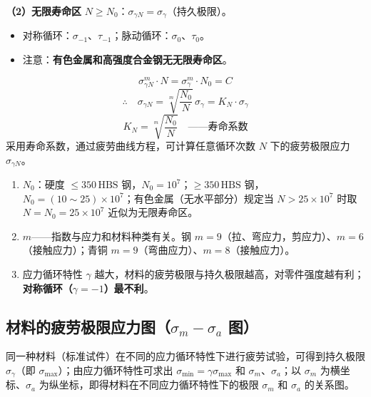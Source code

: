 \textbf{（2）无限寿命区} $N\ge N_0$：$\sigma_{\gamma N}=\sigma_\gamma$（持久极限）。
\begin{itemize}
	\item 对称循环：$\sigma_{-1}$、$\tau_{-1}$；脉动循环：$\sigma_0$、$\tau_0$。
	\item 注意：\textbf{有色金属和高强度合金钢无无限寿命区}。
\end{itemize}

\begin{theorem}[疲劳曲线方程]
\label{thm:疲劳曲线方程}
\begin{equation}
	\sigma_{\gamma N}^m \cdot N = \sigma_\gamma^m \cdot N_0 = C
	\label{eq:强度:疲劳曲线方程}
\end{equation}
\begin{equation}
	\therefore\quad \sigma_{\gamma N}=\sqrt[m]{\frac{N_0}{N}}\,\sigma_\gamma = K_N\cdot\sigma_\gamma
	\label{eq:强度:疲劳极限有限寿命}
\end{equation}
\begin{equation}
	K_N=\sqrt[m]{\frac{N_0}{N}}\quad\text{——寿命系数}
	\label{eq:强度:寿命系数}
\end{equation}
采用寿命系数，通过疲劳曲线方程，可计算任意循环次数 $N$ 下的疲劳极限应力 $\sigma_{\gamma N}$。
\end{theorem}

\begin{note}
\begin{enumerate}
	\item $N_0$：硬度 $\le350\,\text{HBS}$ 钢，$N_0=10^7$；$\ge350\,\text{HBS}$ 钢，$N_0=(10\sim25)\times10^7$；有色金属（无水平部分）规定当 $N>25\times10^7$ 时取 $N=N_0=25\times10^7$ 近似为无限寿命区。
	\item $m$——指数与应力和材料种类有关。钢 $m=9$（拉、弯应力，剪应力）、$m=6$（接触应力）；青铜 $m=9$（弯曲应力）、$m=8$（接触应力）。
	\item 应力循环特性 $\gamma$ 越大，材料的疲劳极限与持久极限越高，对零件强度越有利；\textbf{对称循环（$\gamma=-1$）最不利}。
\end{enumerate}
\end{note}

\subsection{材料的疲劳极限应力图（$\sigma_m-\sigma_a$ 图）}

同一种材料（标准试件）在不同的应力循环特性下进行疲劳试验，可得到持久极限 $\sigma_\gamma$（即 $\sigma_{\max}$）；由应力循环特性可求出 $\sigma_{\min}=\gamma\sigma_{\max}$ 和 $\sigma_m$、$\sigma_a$；以 $\sigma_m$ 为横坐标、$\sigma_a$ 为纵坐标，即得材料在不同应力循环特性下的极限 $\sigma_m$ 和 $\sigma_a$ 的关系图。

